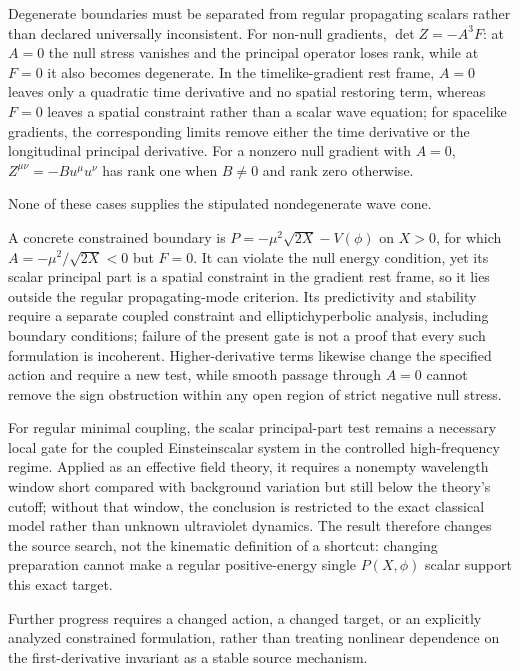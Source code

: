 \documentclass[11pt]{article}
\begin{document}
Degenerate boundaries must be separated from regular propagating scalars rather than declared universally inconsistent. For non-null gradients, $\det Z=-A^3F$: at $A=0$ the null stress vanishes and the principal operator loses rank, while at $F=0$ it also becomes degenerate. In the timelike-gradient rest frame, $A=0$ leaves only a quadratic time derivative and no spatial restoring term, whereas $F=0$ leaves a spatial constraint rather than a scalar wave equation; for spacelike gradients, the corresponding limits remove either the time derivative or the longitudinal principal derivative. For a nonzero null gradient with $A=0$, $Z^{\mu\nu}=-B u^\mu u^\nu$ has rank one when $B\ne0$ and rank zero otherwise.

None of these cases supplies the stipulated nondegenerate wave cone.

A concrete constrained boundary is $P=-\mu^2\sqrt{2X}-V(\phi)$ on $X>0$, for which $A=-\mu^2/\sqrt{2X}<0$ but $F=0$. It can violate the null energy condition, yet its scalar principal part is a spatial constraint in the gradient rest frame, so it lies outside the regular propagating-mode criterion. Its predictivity and stability require a separate coupled constraint and elliptic\textendash{}\allowbreak{}hyperbolic analysis, including boundary conditions; failure of the present gate is not a proof that every such formulation is incoherent. Higher-derivative terms likewise change the specified action and require a new test, while smooth passage through $A=0$ cannot remove the sign obstruction within any open region of strict negative null stress.

For regular minimal coupling, the scalar principal-part test remains a necessary local gate for the coupled Einstein\textendash{}\allowbreak{}scalar system in the controlled high-frequency regime. Applied as an effective field theory, it requires a nonempty wavelength window short compared with background variation but still below the theory\textquoteright{}s cutoff; without that window, the conclusion is restricted to the exact classical model rather than unknown ultraviolet dynamics. The result therefore changes the source search, not the kinematic definition of a shortcut: changing preparation cannot make a regular positive-energy single $P(X,\phi)$ scalar support this exact target.

Further progress requires a changed action, a changed target, or an explicitly analyzed constrained formulation, rather than treating nonlinear dependence on the first-derivative invariant as a stable source mechanism.
\end{document}
